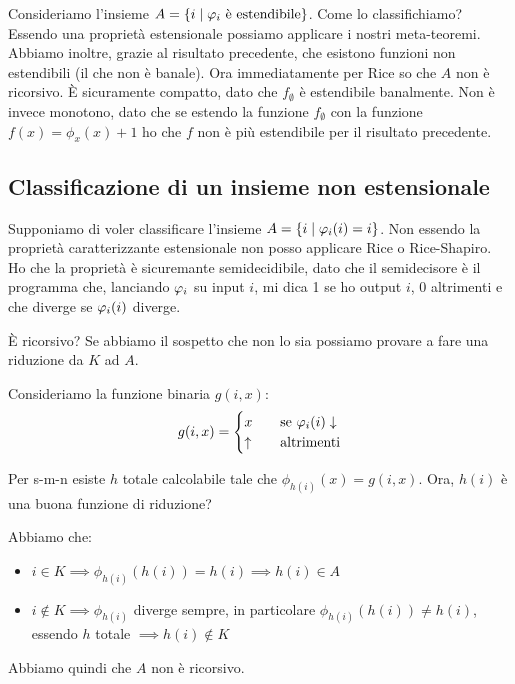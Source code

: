 Consideriamo l'insieme $A = \{i \mid \varphi_{i} \text{ è estendibile}\}$. Come lo classifichiamo? Essendo una
proprietà estensionale possiamo applicare i nostri meta-teoremi. Abbiamo inoltre, grazie al
risultato precedente, che esistono funzioni non estendibili (il che non è banale). Ora
immediatamente per Rice so che $A$ non è ricorsivo. È sicuramente compatto, dato
che $f_{\emptyset}$ è estendibile banalmente. Non è invece monotono, dato che se estendo la funzione
$f_{\emptyset}$ con la funzione $f(x) = \phi_{x}(x) + 1$  ho che $f$ non è più estendibile per il
risultato precedente.

\subsection{Classificazione di un insieme non estensionale}

Supponiamo di voler classificare l'insieme $A = \{i \mid \varphi_{i}(i) = i\}$. Non essendo la proprietà
caratterizzante estensionale non posso applicare Rice o Rice-Shapiro. Ho che la proprietà è
sicuremante semidecidibile, dato che il semidecisore è il programma che, lanciando $\varphi_{i}$ su input
$i$, mi dica 1 se ho output $i$, 0 altrimenti e che diverge se $\varphi_{i}(i)$ diverge.

È ricorsivo? Se abbiamo il sospetto che non lo sia possiamo provare a fare una riduzione da $K$ ad
$A$.

Consideriamo la funzione binaria $g(i,x)$:
\begin{equation*}
    g(i,x) =
    \begin{cases}
        x \quad &\text{se $\varphi_{i}(i) \downarrow$} \\
        \uparrow \quad &\text{altrimenti}
    \end{cases}
\end{equation*}

Per s-m-n esiste $h$ totale calcolabile tale che $\phi_{h(i)}(x) = g(i,x)$. Ora, $h(i)$ è una buona funzione di
riduzione?

Abbiamo che:
\begin{itemize}
    \item $i \in K \implies \phi_{h(i)}(h(i)) = h(i) \implies h(i) \in A$
    \item $i \notin K \implies \phi_{h(i)}$ diverge sempre, in particolare $\phi_{h(i)}(h(i)) \not=
    h(i)$, essendo $h$ totale $ \implies h(i) \notin K$
\end{itemize}

Abbiamo quindi che $A$ non è ricorsivo.

